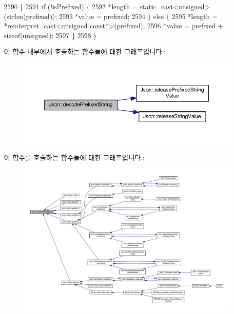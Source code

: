 \begin{DoxyCode}
2590 \{
2591   \textcolor{keywordflow}{if} (!isPrefixed) \{
2592     *length = \textcolor{keyword}{static\_cast<}\textcolor{keywordtype}{unsigned}\textcolor{keyword}{>}(strlen(prefixed));
2593     *value = prefixed;
2594   \} \textcolor{keywordflow}{else} \{
2595     *length = *\textcolor{keyword}{reinterpret\_cast<}\textcolor{keywordtype}{unsigned} const*\textcolor{keyword}{>}(prefixed);
2596     *value = prefixed + \textcolor{keyword}{sizeof}(unsigned);
2597   \}
2598 \}
\end{DoxyCode}
이 함수 내부에서 호출하는 함수들에 대한 그래프입니다.\+:\nopagebreak
\begin{figure}[H]
\begin{center}
\leavevmode
\includegraphics[width=350pt]{namespace_json_aad8b4982c1acd164f541fba396ac9fb1_cgraph}
\end{center}
\end{figure}
이 함수를 호출하는 함수들에 대한 그래프입니다.\+:\nopagebreak
\begin{figure}[H]
\begin{center}
\leavevmode
\includegraphics[width=350pt]{namespace_json_aad8b4982c1acd164f541fba396ac9fb1_icgraph}
\end{center}
\end{figure}
\mbox{\label{namespace_json_a9795a09a0141d1f12d307c4386aeaee6}} 
